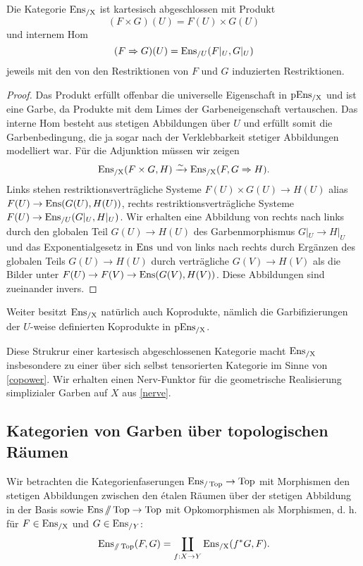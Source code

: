 \begin{prop} \label{ensx-cart-closed}
  Die Kategorie $\operatorname{Ens_{/X}}$ ist kartesisch abgeschlossen mit Produkt
  \[ (F \times G)(U) = F(U) \times G(U) \]
  und internem Hom
  \[ (F \Rightarrow G)(U) = \operatorname{Ens}_{/U}(F|_U, G|_U) \]
  jeweils mit den von den Restriktionen von $F$ und $G$ induzierten
  Restriktionen.
\end{prop}
\begin{proof}
  Das Produkt erfüllt offenbar die universelle Eigenschaft in $\operatorname{pEns_{/X}}$
  und ist eine Garbe, da Produkte mit dem Limes der Garbeneigenschaft
  vertauschen. Das interne Hom besteht aus stetigen Abbildungen über
  $U$ und erfüllt somit die Garbenbedingung, die ja sogar nach der
  Verklebbarkeit stetiger Abbildungen modelliert war. Für die
  Adjunktion müssen wir zeigen
  \[ \operatorname{Ens_{/X}}(F \times G, H) \xrightarrow[]{\sim} \operatorname{Ens_{/X}}(F, G \Rightarrow H). \]
  Links stehen restriktionsverträgliche Systeme $F(U) \times G(U) \to
  H(U)$ alias $F(U) \to \operatorname{Ens}(G(U), H(U))$, rechts
  restriktionsverträgliche Systeme $F(U) \to \operatorname{Ens}_{/U}(G|_U,
  H|_U)$. Wir erhalten eine Abbildung von rechts nach links durch den
  globalen Teil $G(U) \to H(U)$ des Garbenmorphismus $G|_U \to H|_U$
  und das Exponentialgesetz in $\operatorname{Ens}$ und von links nach rechts durch
  Ergänzen des globalen Teils $G(U) \to H(U)$ durch verträgliche $G(V)
  \to H(V)$ als die Bilder unter $F(U) \to F(V) \to \operatorname{Ens}(G(V),
  H(V))$. Diese Abbildungen sind zueinander invers.
\end{proof}
Weiter besitzt $\operatorname{Ens_{/X}}$ natürlich auch Koprodukte, nämlich die
Garbifizierungen der $U$-weise definierten Koprodukte in $\operatorname{pEns_{/X}}$.


Diese Strukrur einer kartesisch abgeschlossenen Kategorie macht
$\operatorname{Ens_{/X}}$ insbesondere zu einer über sich selbst tensorierten Kategorie
im Sinne von \ref{copower}. Wir erhalten einen Nerv-Funktor für die
geometrische Realisierung simplizialer Garben auf $X$ aus \ref{nerve}.

\subsection{Kategorien von Garben über topologischen Räumen}

Wir betrachten die Kategorienfaserungen $\operatorname{Ens}_{/\operatorname{Top}} \to \operatorname{Top}$ mit
Morphismen den stetigen Abbildungen zwischen den étalen Räumen über
der stetigen Abbildung in der Basis sowie $\operatorname{Ens}{\mathbin{/\mkern-6mu/} \operatorname{Top}} \to
\operatorname{Top}$ mit Opkomorphismen als Morphismen, d. h. für $F \in \operatorname{Ens_{/X}}$ und
$G \in \operatorname{Ens}_{/Y}$:
\[ \operatorname{Ens}_{\mathbin{/\mkern-6mu/} \operatorname{Top}}(F, G) = \coprod_{f: X \to Y} \operatorname{Ens_{/X}}(f^* G, F). \]

